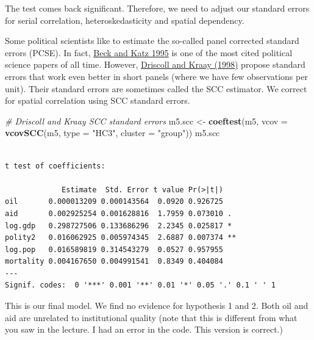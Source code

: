 \documentclass[]{article}
\newenvironment{Shaded}{\begin{snugshade}}{\end{snugshade}}
\newcommand{\KeywordTok}[1]{\textcolor[rgb]{0.13,0.29,0.53}{\textbf{#1}}}
\newcommand{\DataTypeTok}[1]{\textcolor[rgb]{0.13,0.29,0.53}{#1}}
\newcommand{\StringTok}[1]{\textcolor[rgb]{0.31,0.60,0.02}{#1}}
\newcommand{\CommentTok}[1]{\textcolor[rgb]{0.56,0.35,0.01}{\textit{#1}}}
\newcommand{\NormalTok}[1]{#1}
\theoremstyle{definition}
\theoremstyle{definition}
\theoremstyle{definition}
\theoremstyle{remark}
\begin{document}
The test comes back significant. Therefore, we need to adjust our
standard errors for serial correlation, heteroskedasticity and spatial
dependency.

Some political scientists like to estimate the so-called panel corrected
standard errors (PCSE). In fact,
\href{https://www.cambridge.org/core/journals/american-political-science-review/article/what-to-do-and-not-to-do-with-timeseries-crosssection-data/0E778B85AB008DAF8D13E0AC63505E37}{Beck
and Katz 1995} is one of the most cited political science papers of all
time. However,
\href{https://www.mitpressjournals.org/doi/abs/10.1162/003465398557825?casa_token=vV9SnvSYao0AAAAA:7wxGG2rWdlkyrCEAmjZ_5jT0fVmr-zvW7mOl9tjr9JN0zaEeH0yV-kIdGIZyVzZ9YIJpL9Qjgdc}{Driscoll
and Kraay (1998)} propose standard errors that work even better in short
panels (where we have few observations per unit). Their standard errors
are sometimes called the SCC estimator. We correct for spatial
correlation using SCC standard errors.

\begin{Shaded}
\begin{Highlighting}[]
\CommentTok{# Driscoll and Kraay SCC standard errors}
\NormalTok{m5.scc <-}\StringTok{ }\KeywordTok{coeftest}\NormalTok{(m5, }\DataTypeTok{vcov =} \KeywordTok{vcovSCC}\NormalTok{(m5, }\DataTypeTok{type =} \StringTok{"HC3"}\NormalTok{, }\DataTypeTok{cluster =} \StringTok{"group"}\NormalTok{))}
\NormalTok{m5.scc}
\end{Highlighting}
\end{Shaded}

\begin{verbatim}

t test of coefficients:

             Estimate  Std. Error t value Pr(>|t|)   
oil       0.000013209 0.000143564  0.0920 0.926725   
aid       0.002925254 0.001628816  1.7959 0.073010 . 
log.gdp   0.298727506 0.133686296  2.2345 0.025817 * 
polity2   0.016062925 0.005974345  2.6887 0.007374 **
log.pop   0.016589819 0.314543279  0.0527 0.957955   
mortality 0.004167650 0.004991541  0.8349 0.404084   
---
Signif. codes:  0 '***' 0.001 '**' 0.01 '*' 0.05 '.' 0.1 ' ' 1
\end{verbatim}

This is our final model. We find no evidence for hypothesis 1 and 2.
Both oil and aid are unrelated to institutional quality (note that this
is different from what you saw in the lecture. I had an error in the
code. This version is correct.)
\end{document}
